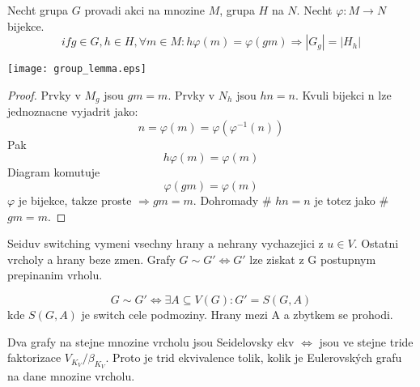 \begin{theorem}
\end{theorem}

\begin{lemma}
Necht grupa $G$ provadi akci na mnozine $M$, grupa $H$ na $N$. Necht $\varphi:M \to N$ bijekce.
	\[ if g \in G, h \in H, \forall m \in M: h\varphi(m) = \varphi(gm) \Rightarrow |G_{g}| = |H_{h}| \]

	\texttt{[image: group\_lemma.eps]}
\end{lemma}
\begin{proof}
Prvky v $M_g$ jsou $gm = m$. Prvky v $N_h$ jsou $hn = n$. Kvuli bijekci n lze jednoznacne vyjadrit jako:
\[ n = \varphi(m) = \varphi(\varphi^{-1}(n)) \]
Pak
\[ h\varphi(m) = \varphi(m) \]
Diagram komutuje
\[ \varphi(gm) = \varphi(m) \]
$\varphi$ je bijekce, takze proste $\Rightarrow gm = m$. Dohromady \# $hn = n$ je totez jako \# $gm = m$.
\end{proof}

\begin{definition}
Seiduv switching vymeni vsechny hrany a nehrany vychazejici z $u \in V$. Ostatni vrcholy a hrany beze zmen. Grafy $G \sim G' \iff G'$ lze ziskat z G postupnym prepinanim vrholu.
\end{definition}

\begin{note}
	\[ G \sim G' \iff \exists A \subseteq V(G): G' = S(G,A) \]
	kde $S(G,A)$ je switch cele podmoziny. Hrany mezi A a zbytkem se prohodi.
\end{note}

\begin{note}
	Dva grafy na stejne mnozine vrcholu jsou Seidelovsky ekv $\iff$ jsou ve stejne tride faktorizace $V_{K_V}/ \beta_{K_V}$.
	Proto je trid ekvivalence tolik, kolik je Eulerovských grafu na dane mnozine vrcholu.
\end{note}

